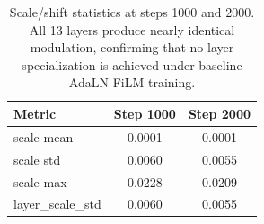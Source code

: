 \documentclass[11pt,a4paper]{article}
\begin{document}
\begin{table}[H]
\centering
\begin{tabular}{lcc}
\toprule
\textbf{Metric} & \textbf{Step 1000} & \textbf{Step 2000} \\
\midrule
scale mean         & 0.0001 & 0.0001 \\
scale std          & 0.0060 & 0.0055 \\
scale max          & 0.0228 & 0.0209 \\
layer\_scale\_std  & 0.0060 & 0.0055 \\
\bottomrule
\end{tabular}
\caption{Scale/shift statistics at steps 1000 and 2000. All 13 layers produce nearly
identical modulation, confirming that no layer specialization is achieved under
baseline AdaLN FiLM training.}
\end{table}



\end{document}
